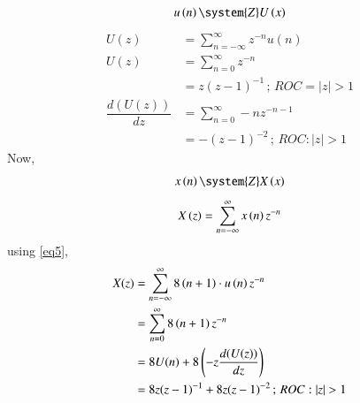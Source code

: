 \documentclass[journal,12pt,twocolumn]{IEEEtran}
\theoremstyle{remark}
\begin{document}
\begin{align}
    u\brak{n} \system{Z} U\brak{x}
\end{align}
\begin{align}
    U(z) &= \sum\limits_{n=-\infty}^{\infty}z^{-n}u(n)  \\
    U(z) &= \sum\limits_{n=0}^{\infty}z^{-n}   \\
    &= z{(z-1)}^{-1} \, ;\, ROC=|z|>1  \\
    \dfrac{d(U(z))}{dz} &= \sum\limits_{n=0}^{\infty}-nz^{-n-1}   \\
    &=-{(z-1)}^{-2} \, ; \, ROC:|z|>1
\end{align}
Now,
\begin{align}
    x\brak{n} \system{Z} X\brak{x}
\end{align}
\begin{align}
    X\left(z\right) &= \sum\limits_{n=-\infty}^{\infty}x\left(n\right) z^{-n}   \\
\end{align}
using \eqref{eq5}, 
\begin{align}
    X(z )&= \sum\limits_{n=-\infty}^{\infty} 8\brak{n+1} \cdot u\brak{n} z^{-n}  \\
    &= \sum\limits_{n=0}^{\infty} 8\brak{n+1} z^{-n}    \\
    &= 8U(n)+8\left (-z\dfrac{d(U(z))}{dz}\right )   \\
    &= 8z{(z-1)}^{-1}+8z{(z-1)}^{-2} \, ; \, ROC:|z|>1 
\end{align}

\end{document}
